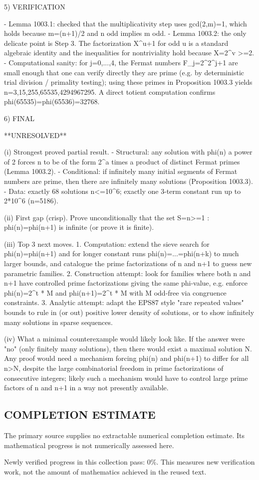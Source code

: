 5) VERIFICATION

- Lemma 1003.1: checked that the multiplicativity step uses gcd(2,m)=1, which holds because m=(n+1)/2 and n odd implies m odd.
- Lemma 1003.2: the only delicate point is Step 3. The factorization X^u+1 for odd u is a standard algebraic identity and the inequalities for nontriviality hold because X=2^v >=2.
- Computational sanity: for j=0,...,4, the Fermat numbers F_j=2^{2^j}+1 are small enough that one can verify directly they are prime (e.g. by deterministic trial division / primality testing); using these primes in Proposition 1003.3 yields n=3,15,255,65535,4294967295. A direct totient computation confirms phi(65535)=phi(65536)=32768.

6) FINAL

**UNRESOLVED**

(i) Strongest proved partial result.
- Structural: any solution with phi(n) a power of 2 forces n to be of the form 2^a times a product of distinct Fermat primes (Lemma 1003.2).
- Conditional: if infinitely many initial segments of Fermat numbers are prime, then there are infinitely many solutions (Proposition 1003.3).
- Data: exactly 68 solutions n<=10^6; exactly one 3-term constant run up to 2*10^6 (n=5186).

(ii) First gap (crisp).
Prove unconditionally that the set S={n>=1 : phi(n)=phi(n+1)} is infinite (or prove it is finite).

(iii) Top 3 next moves.
1. Computation: extend the sieve search for phi(n)=phi(n+1) and for longer constant runs phi(n)=...=phi(n+k) to much larger bounds, and catalogue the prime factorizations of n and n+1 to guess new parametric families.
2. Construction attempt: look for families where both n and n+1 have controlled prime factorizations giving the same phi-value, e.g. enforce phi(n)=2^t * M and phi(n+1)=2^t * M with M odd-free via congruence constraints.
3. Analytic attempt: adapt the EPS87 style "rare repeated values" bounds to rule in (or out) positive lower density of solutions, or to show infinitely many solutions in sparse sequences.

(iv) What a minimal counterexample would likely look like.
If the answer were "no" (only finitely many solutions), then there would exist a maximal solution N. Any proof would need a mechanism forcing phi(n) and phi(n+1) to differ for all n>N, despite the large combinatorial freedom in prime factorizations of consecutive integers; likely such a mechanism would have to control large prime factors of n and n+1 in a way not presently available.




\subsection*{COMPLETION ESTIMATE}
The primary source supplies no extractable numerical completion estimate. Its mathematical progress is not numerically assessed here.

Newly verified progress in this collection pass: $0\%$. This measures new verification work, not the amount of mathematics achieved in the reused text.
